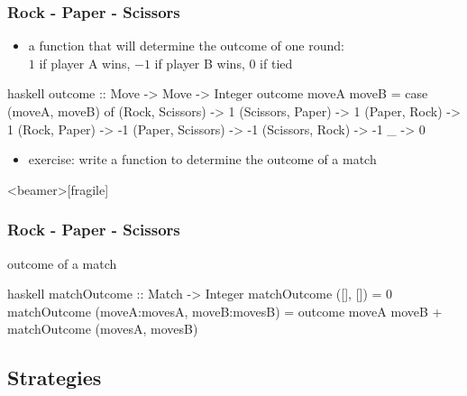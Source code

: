 \documentclass[dvipsnames]{beamer}
\theoremstyle{plain}
\begin{document}
\begin{frame}[fragile]
  \frametitle{Rock - Paper - Scissors}

  \begin{itemize}
    \item a function that will determine the outcome of one round:\\
      $1$ if player A wins, $-1$ if player B wins, $0$ if tied
  \end{itemize}

  \begin{exampleblock}{}
    \begin{pygments}{haskell}
outcome :: Move -> Move -> Integer
outcome moveA moveB =
    case (moveA, moveB) of
      (Rock,     Scissors) -> 1
      (Scissors, Paper)    -> 1
      (Paper,    Rock)     -> 1
      (Rock,     Paper)    -> -1
      (Paper,    Scissors) -> -1
      (Scissors, Rock)     -> -1
      _                    -> 0
    \end{pygments}
  \end{exampleblock}

  \pause
  \begin{itemize}
    \item exercise: write a function to determine the outcome of a match
  \end{itemize}
\end{frame}

\begin{frame}<beamer>[fragile]
  \frametitle{Rock - Paper - Scissors}

  \begin{exampleblock}{outcome of a match}
    \begin{pygments}{haskell}
matchOutcome :: Match -> Integer
matchOutcome ([],           [])           = 0
matchOutcome (moveA:movesA, moveB:movesB) =
    outcome moveA moveB + matchOutcome (movesA, movesB)
    \end{pygments}
  \end{exampleblock}
\end{frame}

\subsection{Strategies}
\end{document}
